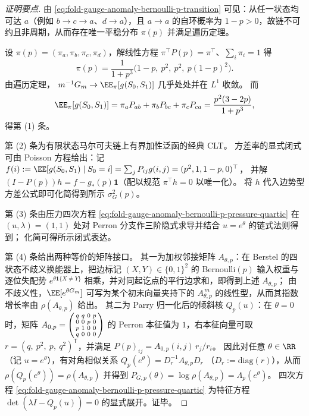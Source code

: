 \begin{proof}[证明要点]
由 \eqref{eq:fold-gauge-anomaly-bernoulli-p-transition} 可见：从任一状态均可达 \(a\)（例如 \(b\to c\to a\)、\(d\to a\)），且 \(a\to a\) 的自环概率为 \(1-p>0\)，故链不可约且非周期，从而存在唯一平稳分布 \(\pi(p)\) 并满足遍历定理。
\par
设 \(\pi(p)=(\pi_a,\pi_b,\pi_c,\pi_d)\)，解线性方程 \(\pi^\top P(p)=\pi^\top\)、\(\sum_i\pi_i=1\) 得
\[
\pi(p)=\frac{1}{1+p^3}\bigl(1-p,\ p^2,\ p^2,\ p(1-p)^2\bigr).
\]
由遍历定理，
\(
m^{-1}G_m\to \EE_\pi[g(S_0,S_1)]
\)
几乎处处并在 \(L^1\) 收敛。
而
\[
\EE_\pi[g(S_0,S_1)]
=\pi_a P_{ab}+\pi_b P_{bc}+\pi_c P_{ca}
=\frac{p^2(3-2p)}{1+p^3},
\]
得第 (1) 条。
\par
第 (2) 条为有限状态马尔可夫链上有界加性泛函的经典 CLT。
方差率的显式闭式可由 Poisson 方程给出：记
\(
f(i):=\EE[g(S_0,S_1)\mid S_0=i]=\sum_jP_{ij}g(i,j)
=(p^2,1,1-p,0)^\top
\)，
并解 \((I-P(p))h=f-g_\ast(p)\mathbf 1\)（配以规范 \(\pi^\top h=0\) 以唯一化）。
将 \(h\) 代入边势型方差公式即可化简得到所示 \(\sigma_G^2(p)\)。
\par
第 (3) 条由压力四次方程 \eqref{eq:fold-gauge-anomaly-bernoulli-p-pressure-quartic} 在 \((u,\lambda)=(1,1)\) 处对 Perron 分支作三阶隐式求导并结合 \(u=e^\theta\) 的链式法则得到；
化简可得所示闭式表达。
\par
第 (4) 条给出两种等价的矩阵接口。
其一为加权邻接矩阵 \(A_{\theta,p}\)：在 Berstel 的四状态不歧义换能器上，把边标记 \((X,Y)\in\{0,1\}^2\) 的 Bernoulli\((p)\) 输入权重与逐位失配势 \(e^{\theta\mathbf 1\{X\neq Y\}}\) 相乘，并对同起讫点的平行边求和，即得到上述 \(A_{\theta,p}\)；
由不歧义性，\(\EE[e^{\theta G_m}]\) 可写为某个初末向量夹持下的 \(A_{\theta,p}^{\,m}\) 的线性型，从而其指数增长率由 \(\rho(A_{\theta,p})\) 给出。
其二为 Parry 归一化后的倾斜核 \(Q_p(u)\)：在 \(\theta=0\) 时，矩阵
\(
A_{0,p}=
\begin{psmallmatrix}
q & q & 0 & p\\
0 & 0 & p & 0\\
p & 1 & 0 & 0\\
q & 0 & 0 & 0
\end{psmallmatrix}
\)
的 Perron 本征值为 \(1\)，右本征向量可取
\(
r=(q,\ p^2,\ p,\ q^2)^{\mathsf T}
\)，并满足 \(P(p)_{ij}=A_{0,p}(i,j)\,r_j/r_i\)。
因此对任意 \(\theta\in\RR\)（记 \(u=e^\theta\)），有对角相似关系
\(
Q_p(e^\theta)=D_r^{-1}A_{\theta,p}D_r
\)
（\(D_r:=\mathrm{diag}(r)\)），从而 \(\rho(Q_p(e^\theta))=\rho(A_{\theta,p})\) 并得到
\(
P_{G,p}(\theta)=\log\rho(A_{\theta,p})=\Lambda_p(e^\theta)
\)。
四次方程 \eqref{eq:fold-gauge-anomaly-bernoulli-p-pressure-quartic} 为特征方程 \(\det(\lambda I-Q_p(u))=0\) 的显式展开。证毕。
\end{proof}

